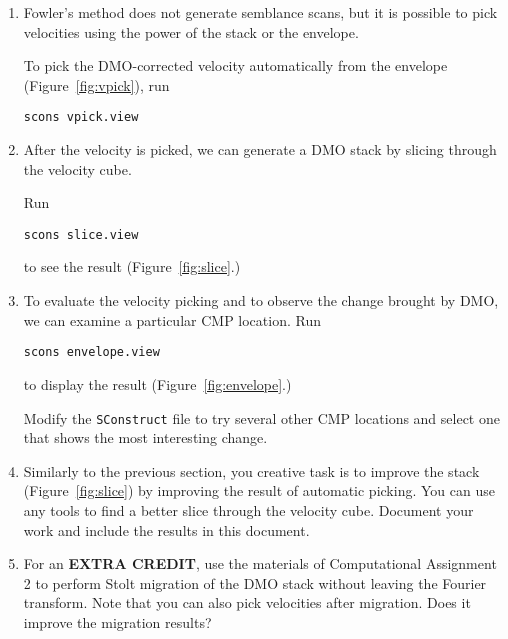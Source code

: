 \begin{enumerate}
\item Fowler's method does not generate semblance scans, but it is possible to pick velocities using the power of the stack or the envelope.

To pick the DMO-corrected velocity automatically from the envelope (Figure~\ref{fig:vpick}), run
\begin{verbatim}
scons vpick.view
\end{verbatim}


\item After the velocity is picked, we can generate a DMO stack by slicing through the velocity cube. 

Run
\begin{verbatim}
scons slice.view
\end{verbatim}
to see the result (Figure~\ref{fig:slice}.)


\item To evaluate the velocity picking and to observe the change brought by DMO, we can examine a particular CMP location. Run
\begin{verbatim}
scons envelope.view
\end{verbatim}
to display the result (Figure~\ref{fig:envelope}.)

Modify the \texttt{SConstruct} file to try several other CMP locations and select one that shows the most interesting change.


\item Similarly to the previous section, you creative task is to improve the stack (Figure~\ref{fig:slice}) by improving the result of automatic picking. You can use any tools to find a better slice through the velocity cube. Document your work and include the results in this document.

\item For an \textbf{EXTRA CREDIT}, use the materials of Computational Assignment 2 to perform Stolt migration of the DMO stack without leaving the Fourier transform. Note that you can also pick velocities after migration. Does it improve the migration results?

\end{enumerate}

